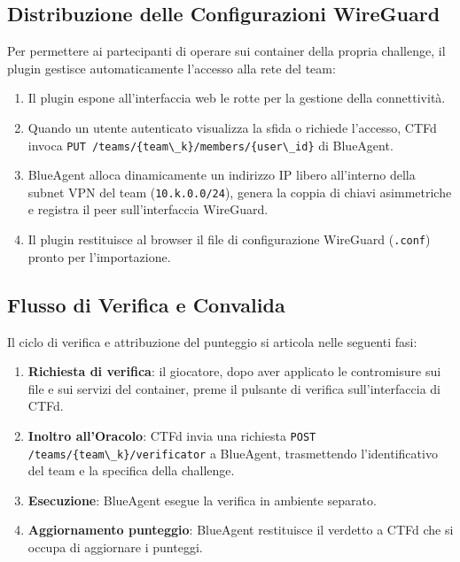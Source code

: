 \subsection{Distribuzione delle Configurazioni
WireGuard}\label{distribuzione-delle-configurazioni-wireguard}

Per permettere ai partecipanti di operare sui container della propria
challenge, il plugin gestisce automaticamente l'accesso alla rete del
team:

\begin{enumerate}
\def\labelenumi{\arabic{enumi}.}
\tightlist
\item
  Il plugin espone all'interfaccia web le rotte per la gestione della
  connettività.
\item
  Quando un utente autenticato visualizza la sfida o richiede l'accesso,
  CTFd invoca
  \passthrough{\lstinline!PUT /teams/\{team\_k\}/members/\{user\_id\}!}
  di BlueAgent.
\item
  BlueAgent alloca dinamicamente un indirizzo IP libero all'interno
  della subnet VPN del team (\passthrough{\lstinline!10.k.0.0/24!}),
  genera la coppia di chiavi asimmetriche e registra il peer
  sull'interfaccia WireGuard.
\item
  Il plugin restituisce al browser il file di configurazione WireGuard
  (\passthrough{\lstinline!.conf!}) pronto per l'importazione.
\end{enumerate}

\subsection{Flusso di Verifica e
Convalida}\label{flusso-di-verifica-e-convalida}

Il ciclo di verifica e attribuzione del punteggio si articola nelle
seguenti fasi:

\begin{enumerate}
\def\labelenumi{\arabic{enumi}.}
\tightlist
\item
  \textbf{Richiesta di verifica}: il giocatore, dopo aver applicato le
  contromisure sui file e sui servizi del container, preme il pulsante
  di verifica sull'interfaccia di CTFd.
\item
  \textbf{Inoltro all'Oracolo}: CTFd invia una richiesta
  \passthrough{\lstinline!POST /teams/\{team\_k\}/verificator!} a
  BlueAgent, trasmettendo l'identificativo del team e la specifica della
  challenge.
\item
  \textbf{Esecuzione}: BlueAgent esegue la verifica in ambiente
  separato.
\item
  \textbf{Aggiornamento punteggio}: BlueAgent restituisce il verdetto a
  CTFd che si occupa di aggiornare i punteggi.
\end{enumerate}
